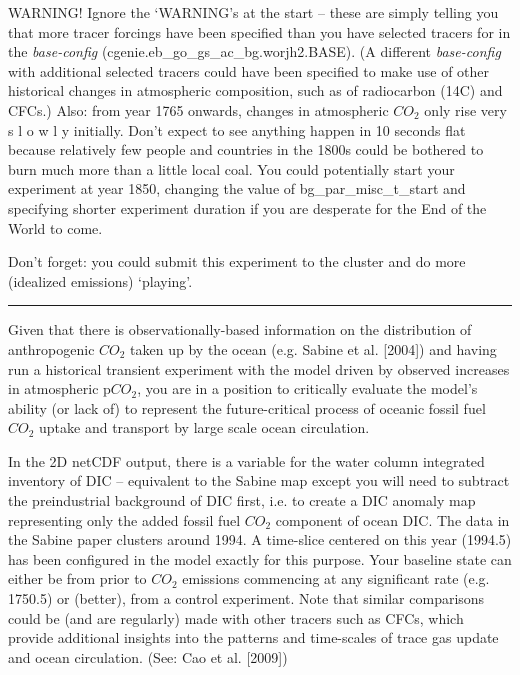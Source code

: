 \documentclass[11pt,fleqn]{book} %
\begin{document}
WARNING! Ignore the ‘WARNING’s at the start -- these are simply telling you that more tracer forcings have been specified than you have selected tracers for in the \textit{base-config} (cgenie.eb\_go\_gs\_ac\_bg.worjh2.BASE). (A different \textit{base-config} with additional selected tracers could have been specified to make use of other historical changes in atmospheric composition, such as of radiocarbon (14C) and CFCs.) Also: from year 1765 onwards, changes in atmospheric \(CO_{2}\) only rise very s l o w l y initially. Don’t expect to see anything happen in 10 seconds flat because relatively few people and countries in the 1800s could be bothered to burn much more than a little local coal. You could potentially start your experiment at year 1850, changing the value of bg\_par\_misc\_t\_start and specifying shorter experiment duration if you are desperate for the End of the World to come.

Don’t forget: you could submit this experiment to the cluster and do more (idealized emissions) ‘playing’.

\vspace{1mm}
\noindent\rule{4cm}{0.1mm}
\vspace{2mm}

\noindent Given that there is observationally-based information on the distribution of anthropogenic \(CO_{2}\) taken up by the ocean (e.g. Sabine et al. [2004]) and having run a historical transient experiment with the model driven by observed increases in atmospheric p\(CO_{2}\), you are in a position to critically evaluate the model’s ability (or lack of) to represent the future-critical process of oceanic fossil fuel \(CO_{2}\) uptake and transport by large scale ocean circulation.

In the 2D netCDF output, there is a variable for the water column integrated inventory of DIC – equivalent to the Sabine map except you will need to subtract the preindustrial background of DIC first, i.e. to create a DIC anomaly map representing only the added fossil fuel \(CO_{2}\) component of ocean DIC. The data in the Sabine paper clusters around 1994. A time-slice centered on this year (1994.5) has been configured in the model exactly for this purpose. Your baseline state can either be from prior to \(CO_{2}\) emissions commencing at any significant rate (e.g. 1750.5) or (better), from a control experiment. Note that similar comparisons could be (and are regularly) made with other tracers such as CFCs, which provide additional insights into the patterns and time-scales of trace gas update and ocean circulation. (See: Cao et al. [2009])
\end{document}
